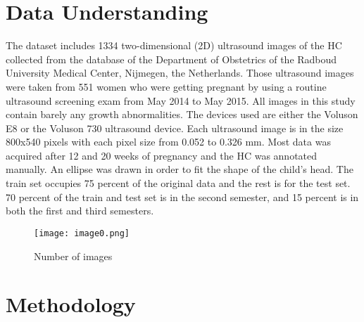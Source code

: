 \documentclass[hidelinks]{report}
\begin{document}
\chapter{Data Understanding}
The dataset includes 1334 two-dimensional (2D) ultrasound images of the HC collected from the database of the Department of Obstetrics of the Radboud University Medical Center, Nijmegen, the Netherlands. Those ultrasound images were taken from 551 women who were getting pregnant by using a routine ultrasound screening exam from May 2014 to May 2015. All images in this study contain barely any growth abnormalities. The devices used are either the Voluson E8 or the Voluson 730 ultrasound device. 
Each ultrasound image is in the size 800x540 pixels with each pixel size from 0.052 to 0.326 mm. Most data was acquired after 12 and 20 weeks of pregnancy and the HC was annotated manually. An ellipse was drawn in order to fit the shape of the child's head. 
The train set occupies 75 percent of the original data and the rest is for the test set. 70 percent of the train and test set is in the second semester, and 15 percent is in both the first and third semesters.
\begin{figure}[H]
    \centering
    \texttt{[image: image0.png]}
    \caption{Number of images}
    \label{fig:enter-label}
\end{figure}
\chapter{Methodology}
\end{document}
